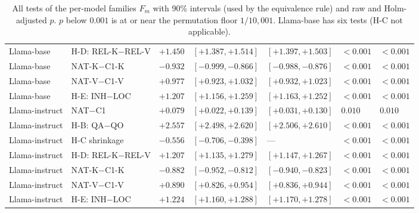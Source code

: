 \begin{table}[p]
\begin{adjustbox}{max width=\linewidth}
\begin{tabular}{@{}l l l l l l l@{}}
Llama-base & H-D: REL-K$-$REL-V & $+1.450$ & $[+1.387, +1.514]$ & $[+1.397, +1.503]$ & $<0.001$ & $<0.001$ \\
Llama-base & NAT-K$-$C1-K & $-0.932$ & $[-0.999, -0.866]$ & $[-0.988, -0.876]$ & $<0.001$ & $<0.001$ \\
Llama-base & NAT-V$-$C1-V & $+0.977$ & $[+0.923, +1.032]$ & $[+0.932, +1.023]$ & $<0.001$ & $<0.001$ \\
Llama-base & H-E: INH$-$LOC & $+1.207$ & $[+1.156, +1.259]$ & $[+1.163, +1.252]$ & $<0.001$ & $<0.001$ \\
\midrule
Llama-instruct & NAT$-$C1 & $+0.079$ & $[+0.022, +0.139]$ & $[+0.031, +0.130]$ & $0.010$ & $0.010$ \\
Llama-instruct & H-B: QA$-$QO & $+2.557$ & $[+2.498, +2.620]$ & $[+2.506, +2.610]$ & $<0.001$ & $<0.001$ \\
Llama-instruct & H-C shrinkage & $-0.556$ & $[-0.706, -0.398]$ & --- & $<0.001$ & $<0.001$ \\
Llama-instruct & H-D: REL-K$-$REL-V & $+1.207$ & $[+1.135, +1.279]$ & $[+1.147, +1.267]$ & $<0.001$ & $<0.001$ \\
Llama-instruct & NAT-K$-$C1-K & $-0.882$ & $[-0.952, -0.812]$ & $[-0.940, -0.823]$ & $<0.001$ & $<0.001$ \\
Llama-instruct & NAT-V$-$C1-V & $+0.890$ & $[+0.826, +0.954]$ & $[+0.836, +0.944]$ & $<0.001$ & $<0.001$ \\
Llama-instruct & H-E: INH$-$LOC & $+1.224$ & $[+1.160, +1.288]$ & $[+1.170, +1.278]$ & $<0.001$ & $<0.001$ \\
\bottomrule
\end{tabular}\end{adjustbox}
\caption{All tests of the per-model families $F_m$ \tagC{} with 90\% intervals (used by the equivalence rule) and raw and Holm-adjusted $p$. $p$ below $0.001$ is at or near the permutation floor $1/10{,}001$. Llama-base has six tests (H-C not applicable).}
\label{tab:fmfull}
\end{table}
